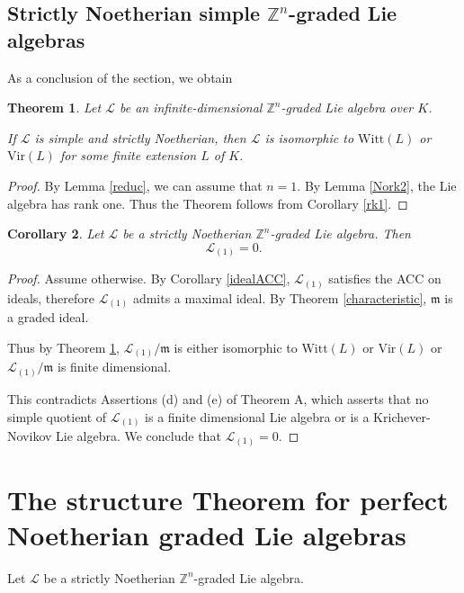 \documentclass[11pt, letterpaper, reqno]{amsart}
\newtheorem{theorem}{Theorem}
\newtheorem{cor}[theorem]{Corollary}
\theoremstyle{definition}
\newcommand{\Z}{{\mathbb Z}}
\newcommand{\cL}{\mathcal L}
\newcommand{\fm}{\mathfrak{m}}
\newcommand{\Vir}{\mathrm{Vir}}
\newcommand{\Witt}{\mathrm{Witt}}
\begin{document}
\subsection{Strictly Noetherian simple $\Z^n$-graded Lie algebras}

As a conclusion of the  section, we obtain

\begin{theorem}\label{simplequot} Let $\cL$ be an
infinite-dimensional $\Z^n$-graded
Lie algebra over $K$. 

If $\cL$ is simple and strictly Noetherian, 
then $\cL$ is isomorphic to
$\Witt(L)$ or $\Vir(L)$ for some 
finite extension $L$ of $K$.
\end{theorem}

\begin{proof} By Lemma \ref{reduc}, we can assume that $n=1$.
By Lemma \ref{Nork2}, the Lie algebra has rank one. Thus 
the Theorem follows from Corollary \ref{rk1}.
\end{proof}


\begin{cor}\label{vanishing} Let $\cL$ be a strictly Noetherian
$\Z^n$-graded Lie algebra. Then
$$\cL_{(1)}=0.$$
\end{cor}

\begin{proof} Assume otherwise. By
Corollary \ref{idealACC}, $\cL_{(1)}$ satisfies the ACC on ideals, therefore $\cL_{(1)}$ admits a maximal ideal. By Theorem \ref{characteristic}, $\fm$ is a graded ideal. 

 Thus by Theorem \ref{simplequot}, $\cL_{(1)}/\fm$ is either isomorphic to
$\Witt(L)$ or $\Vir(L)$  or $\cL_{(1)}/\fm$ is finite dimensional.


This contradicts  Assertions (d) and (e) of Theorem A,
which asserts that no simple quotient of
$\cL_{(1)}$ is a finite dimensional Lie algebra or  is a Krichever-Novikov
Lie algebra. We conclude that $\cL_{(1)}=0$.
\end{proof}







\section{The structure Theorem for perfect Noetherian graded Lie algebras}\label{proofB}

Let $\cL$ be a strictly Noetherian
$\Z^n$-graded Lie algebra. 
\end{document}
